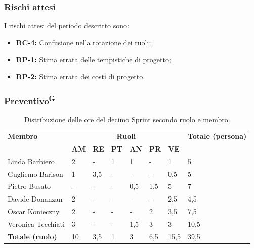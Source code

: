 \documentclass[8pt]{article}
\newcommand{\glossterm}[1]{#1\textsuperscript{G}} %
\begin{document}
\subsubsection{Rischi attesi}
I rischi attesi del periodo descritto sono:
\begin{itemize}
    \setlength\itemsep{0em}
        \item \textbf{RC-4:} Confusione nella rotazione dei ruoli;
        \item \textbf{RP-1:} Stima errata delle tempistiche di progetto;
        \item \textbf{RP-2:} Stima errata dei costi di progetto.
    \end{itemize}
\clearpage
\subsubsection{\glossterm{Preventivo}}\begin{table}[ht!]
	\centering
	\begin{tabular}{p{4cm} p{1cm} p{1cm} p{1cm} p{1cm} p{1cm} p{1cm} p{3cm}}
		\toprule
        \textbf{Membro} & \multicolumn{6}{c}{\textbf{Ruoli}} & \textbf{Totale (persona)}\\
		& \textbf{AM} & \textbf{RE} & \textbf{PT} & \textbf{AN} & \textbf{PR} & \textbf{VE}\\
		\midrule
        Linda Barbiero & 2 & - & 1 & 1 & - & 1 & 5 \\ 
        Gugliemo Barison & 1 & 3,5 & - & - & - & 0,5 & 5 \\ 
        Pietro Busato & - & - & - & 0,5 & 1,5 & 5 & 7 \\ 
        Davide Donanzan & 2 & - & - & - & - & 2,5 & 4,5 \\ 
        Oscar Konieczny & 2 & - & - & - & 2 & 3,5 & 7,5 \\ 
        Veronica Tecchiati & 3 & - & - & 1,5 & 3 & 3 & 10,5 \\
        \midrule
        \textbf{Totale (ruolo)} & 10 & 3,5 & 1 & 3 & 6,5 & 15,5 & 39,5 \\ 
	\bottomrule
	\end{tabular}
	\caption{Distribuzione delle ore del decimo Sprint secondo ruolo e membro.}
	\label{table:Distribuzione delle ore del decimo Sprint secondo ruolo e membro}
\end{table}
\end{document}
